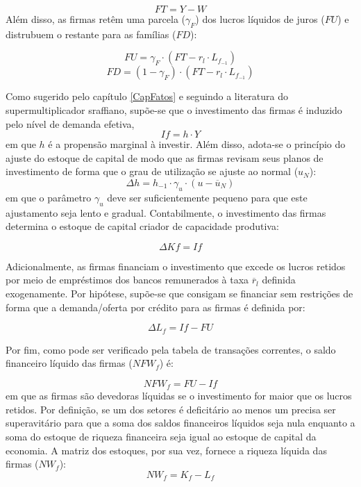 \begin{equation}
    FT = Y - W
\end{equation}
Além disso, as firmas retêm uma parcela ($\gamma_F$) dos lucros líquidos de juros ($FU$) e distrubuem o restante para as famílias ($FD$):

\begin{equation}
    FU = \gamma_F\cdot (FT - r_l\cdot L_{f_{-1}})
\end{equation}
\begin{equation}
    FD = (1-\gamma_F)\cdot (FT - r_l\cdot L_{f_{-1}})
\end{equation}

Como sugerido pelo capítulo \ref{CapFatos} e seguindo a literatura do supermultiplicador sraffiano, supõe-se que o investimento das firmas é induzido pelo nível de demanda efetiva,
\begin{equation}
\label{_If}
    If = h\cdot Y
\end{equation}
em que $h$ é a propensão marginal à investir. Além disso, adota-se o princípio do ajuste do estoque de capital de modo que as firmas revisam seus planos de investimento de forma que o grau de utilização se ajuste ao normal ($u_N$):
\begin{equation}
\label{_h}
    \Delta h = h_{-1}\cdot \gamma_u\cdot (u - \overline{u}_N)
\end{equation}
em que o parâmetro $\gamma_u$ deve ser suficientemente pequeno para que este ajustamento seja lento e gradual. Contabilmente, o investimento das firmas determina o estoque de capital criador de capacidade produtiva:

\begin{equation}
    \Delta Kf = If
\end{equation}

Adicionalmente, as firmas financiam o investimento que excede os lucros retidos por meio de empréstimos dos bancos remunerados à taxa $\overline r_l$ definida exogenamente. Por hipótese, supõe-se que consigam se financiar sem restrições de forma que a demanda/oferta por crédito para as firmas é definida por:

\begin{equation}
    \Delta L_f = If - FU
\end{equation}

Por fim, como pode ser verificado pela tabela de transações correntes, o saldo financeiro líquido das firmas ($NFW_f$) é:

\begin{equation}
    NFW_f = FU - If
\end{equation}
em que as firmas são devedoras líquidas se o investimento for maior que os lucros retidos. Por definição, se um dos setores é deficitário ao menos um precisa ser superavitário para que a soma dos saldos financeiros líquidos seja nula enquanto a soma do estoque de riqueza financeira seja igual ao estoque de capital da economia. A matriz dos estoques, por sua vez, fornece a riqueza líquida das firmas ($NW_f$):
\begin{equation}
    NW_f = K_f - L_f
\end{equation}

